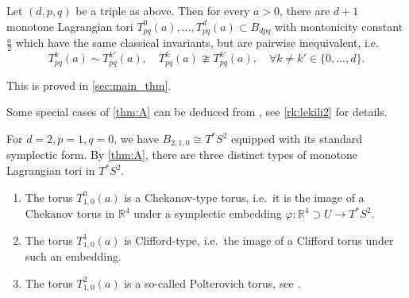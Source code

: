 \documentclass[12pt,a4paper,abstract=true,final]{scrartcl}
\begin{document}
\begin{maintheorem}
    \label{thm:A}
    Let $(d,p,q)$ be a triple as above.
Then for every $a>0$, there are $d+1$ monotone Lagrangian tori $T^0_{pq}(a), \ldots , T^d_{pq}(a) \subset B_{dpq}$ with montonicity constant $\frac{a}{2}$ which have the same classical invariants, but are pairwise inequivalent, i.e.\ 
    \begin{equation}
        T^k_{pq}(a) \sim T^{k'}_{pq}(a), \quad 
         T^k_{pq}(a) \ncong T^{k'}_{pq}(a), \quad
        \forall k \neq k' \in \{0,\ldots,d\}.
    \end{equation}
\end{maintheorem}

This is proved in \cref{sec:main_thm}.

\begin{remark}
    \label{rk:lekili}
    Some special cases of \cref{thm:A} can be deduced from \cite{LekMay14}, see \cref{rk:lekili2} for details.
\end{remark}

\begin{example}
    \label{ex:cotangent}
    For $d=2, p=1, q=0$, we have $B_{2,1,0} \cong T^*S^2$ equipped with its standard symplectic form.
By \cref{thm:A}, there are three distinct types of monotone Lagrangian tori in $T^*S^2$. 
    \begin{enumerate}
        \item The torus $T^0_{1,0}(a)$ is a Chekanov-type torus, i.e.\ it is the image of a Chekanov torus in $\mathbb{R}^4$ under a symplectic embedding $\varphi \colon \mathbb{R}^4 \supset U \rightarrow T^*S^2$.
        \item The torus $T^1_{1,0}(a)$ is Clifford-type, i.e.\ the image of a Clifford torus under such an embedding.
        \item The torus $T^2_{1,0}(a)$ is a so-called Polterovich torus, see \cite{AlbFra08}. 
    \end{enumerate} 
\end{example}
\end{document}
